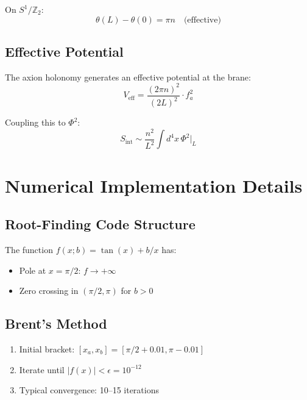 \documentclass[11pt,a4paper]{article}
\theoremstyle{definition}
\theoremstyle{plain}
\theoremstyle{remark}
\begin{document}
On $S^1/\mathbb{Z}_2$:
\begin{equation}
\theta(L) - \theta(0) = \pi n \quad \text{(effective)}
\label{eq:holonomy-constraint}
\end{equation}

\subsection{Effective Potential}

The axion holonomy generates an effective potential at the brane:
\begin{equation}
V_{\mathrm{eff}} = \frac{(2\pi n)^2}{(2L)^2} \cdot f_a^2
\label{eq:V-eff}
\end{equation}

Coupling this to $\Phi^2$:
\begin{equation}
S_{\mathrm{int}} \sim \frac{n^2}{L^2} \int d^4x \, \Phi^2\big|_{L}
\label{eq:axion-phi-coupling}
\end{equation}

\section{Numerical Implementation Details}
\label{app:numerical}

\subsection{Root-Finding Code Structure}

The function $f(x; b) = \tan(x) + b/x$ has:
\begin{itemize}
\item Pole at $x = \pi/2$: $f \to +\infty$
\item Zero crossing in $(\pi/2, \pi)$ for $b > 0$
\end{itemize}

\subsection{Brent's Method}

\begin{enumerate}
\item Initial bracket: $[x_a, x_b] = [\pi/2 + 0.01, \pi - 0.01]$
\item Iterate until $|f(x)| < \epsilon = 10^{-12}$
\item Typical convergence: 10--15 iterations
\end{enumerate}
\end{document}

